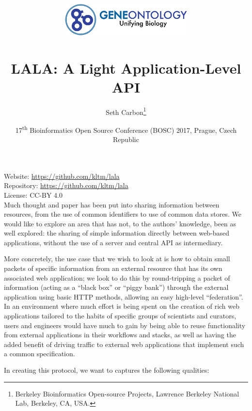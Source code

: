 \documentclass[10pt,oneside]{article}
\title{%
\vspace{-1.5in}
\includegraphics[width=0.5\textwidth,natwidth=485,natheight=125]{go-logo-small.png}\\
~\\LALA: A Light Application-Level API}
\author{
  Seth Carbon\footnote{Berkeley Bioinformatics Open-source Projects, Lawrence Berkeley National Lab, Berkeley, CA, USA.} %
}
\date{17\textsuperscript{th} Bioinformatics Open Source Conference
  (BOSC) 2017, Prague, Czech Republic}
\begin{document}
\maketitle
\thispagestyle{empty}

\vspace{-0.2in}
\noindent
Website: \url{https://github.com/kltm/lala} \\
Repository: \url{https://github.com/kltm/lala} \\
License: CC-BY 4.0 \\


Much thought and paper has been put into sharing information between
resources, from the use of common identifiers to use of common data
stores. We would like to explore an area that has not, to the authors'
knowledge, been as well explored: the sharing of simple information
directly between web-based applications, without the use of a server
and central API as intermediary.

More concretely, the use case that we wish to look at is how to obtain
small packets of specific information from an external resource that
has its own associated web application; we look to do this by
round-tripping a packet of information (acting as a ``black box'' or
``piggy bank'') through the external application using basic HTTP
methods, allowing an easy high-level ``federation''. In an environment
where much effort is being spent on the creation of rich web
applications tailored to the habits of specific groups of scientists
and curators, users and engineers would have much to gain by being
able to reuse functionality from external applications in their
workflows and stacks, as well as having the added benefit of driving
traffic to external web applications that implement such a common
specification.

In creating this protocol, we want to captures the following
qualities:

\end{document}
